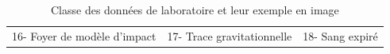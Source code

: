 \documentclass[a4paper]{article}
\begin{document}
\begin{table}[H]
\begin{tabular}{ccc}
        16- Foyer de modèle d'impact & 17- Trace gravitationnelle & 18- Sang expiré \\
    \end{tabular}
    \caption{Classe des données de laboratoire et leur exemple en image}
    \label{tab: images of all classes}
\end{table}
\end{document}
